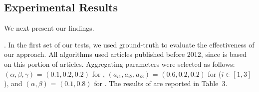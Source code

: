 

\subsection{Experimental Results}
\label{subsec-expres}

We next present our findings.

.
In the first set of our tests, we used ground-truth \recom to evaluate the effectiveness of our approach.
All algorithms used articles published before 2012, since \recom is based on this portion of articles.
Aggregating parameters were selected as follows: $(\alpha,\beta,\gamma)$ = $(0.1, 0.2, 0.2)$ for \futurerank, $(a_{i1},a_{i2},a_{i3})$ = $(0.6, 0.2, 0.2)$ for \hhgrank ($i\in[1,3]$), and $(\alpha,\beta)$ = $(0.1, 0.8)$ for \ensemblerank.
The results of \PairAcc are reported in Table~3.

